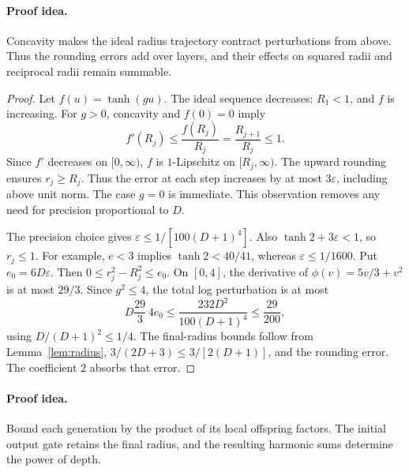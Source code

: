 \paragraph{Proof idea.}
Concavity makes the ideal radius trajectory contract perturbations from
above. Thus the rounding errors add over layers, and their effects on
squared radii and reciprocal radii remain summable.

\begin{proof}
Let \(f(u)=\tanh(gu)\).
The ideal sequence decreases: \(R_1<1\), and \(f\) is increasing.
For \(g>0\), concavity and \(f(0)=0\) imply
\[
f'(R_j)\le\frac{f(R_j)}{R_j}
=\frac{R_{j+1}}{R_j}\le1.
\]
Since \(f'\) decreases on \([0,\infty)\), \(f\) is
\(1\)-Lipschitz on \([R_j,\infty)\).
The upward rounding ensures \(r_j\ge R_j\).
Thus the error at each step increases by at most \(3\varepsilon\),
including above unit norm. The case \(g=0\) is immediate.
This observation removes any need for precision proportional to \(D\).

The precision choice gives
\(\varepsilon\le1/[100(D+1)^4]\).
Also \(\tanh2+3\varepsilon<1\), so \(r_j\le1\).
For example, \(e<3\) implies \(\tanh2<40/41\), whereas
\(\varepsilon\le1/1600\).
Put \(e_0=6D\varepsilon\). Then
\(0\le r_j^2-R_j^2\le e_0\).
On \([0,4]\), the derivative of \(\phi(v)=5v/3+v^2\) is at
most \(29/3\). Since \(g^2\le4\), the total log perturbation is
at most
\[
D\frac{29}{3}\,4e_0
\le\frac{232D^2}{100(D+1)^4}\le\frac{29}{200},
\]
using \(D/(D+1)^2\le1/4\).
The final-radius bounds follow from Lemma~\ref{lem:radius},
\(3/(2D+3)\le3/[2(D+1)]\), and the rounding error.
The coefficient \(2\) absorbs that error.
\end{proof}

\paragraph{Proof idea.}
Bound each generation by the product of its local offspring factors. The
initial output gate retains the final radius, and the resulting harmonic
sums determine the power of depth.

